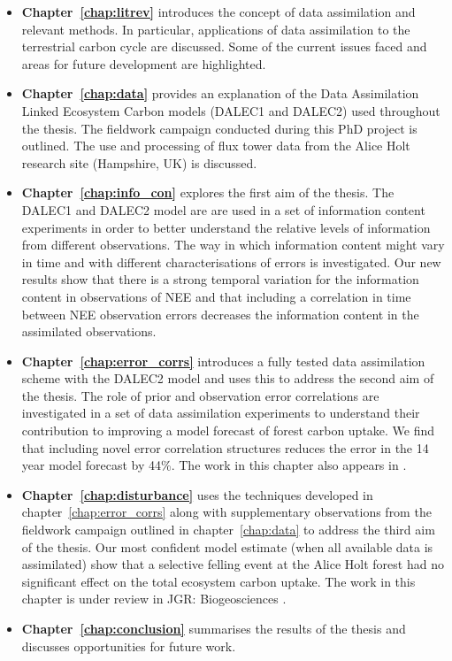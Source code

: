 \begin{itemize}
\item \textbf{Chapter~\ref{chap:litrev}} introduces the concept of data assimilation and relevant methods. In particular, applications of data assimilation to the terrestrial carbon cycle are discussed. Some of the current issues faced and areas for future development are highlighted.  

\item \textbf{Chapter~\ref{chap:data}} provides an explanation of the Data Assimilation Linked Ecosystem Carbon models (DALEC1 and DALEC2) used throughout the thesis. The fieldwork campaign conducted during this PhD project is outlined. The use and processing of flux tower data from the Alice Holt research site (Hampshire, UK) is discussed.

\item \textbf{Chapter~\ref{chap:info_con}} explores the first aim of the thesis. The DALEC1 and DALEC2 model are are used in a set of information content experiments in order to better understand the relative levels of information from different observations. The way in which information content might vary in time and with different characterisations of errors is investigated. Our new results show that there is a strong temporal variation for the information content in observations of NEE and that including a correlation in time between NEE observation errors decreases the information content in the assimilated observations. 

\item \textbf{Chapter~\ref{chap:error_corrs}} introduces a fully tested data assimilation scheme with the DALEC2 model and uses this to address the second aim of the thesis. The role of prior and observation error correlations are investigated in a set of data assimilation experiments to understand their contribution to improving a model forecast of forest carbon uptake. We find that including novel error correlation structures reduces the error in the 14 year model forecast by 44\%. The work in this chapter also appears in \citet{Pinnington2016299} .

\item \textbf{Chapter~\ref{chap:disturbance}} uses the techniques developed in chapter~\ref{chap:error_corrs} along with supplementary observations from the fieldwork campaign outlined in chapter~\ref{chap:data} to address the third aim of the thesis. Our most confident model estimate (when all available data is assimilated) show that a selective felling event at the Alice Holt forest had no significant effect on the total ecosystem carbon uptake. The work in this chapter is under review in JGR: Biogeosciences \citep{Pinnington2017}.

\item \textbf{Chapter~\ref{chap:conclusion}} summarises the results of the thesis and discusses opportunities for future work.    

\end{itemize}

